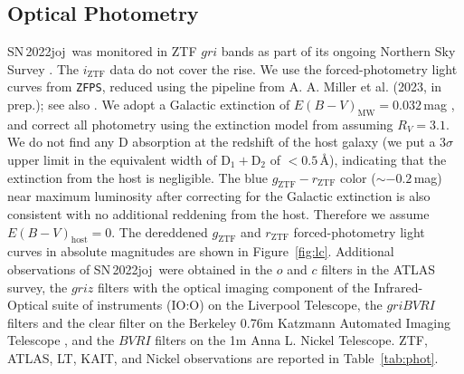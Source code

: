 \documentclass[twocolumn]{aastex631}
\newcommand{\sn}{SN\,2022joj}
\begin{document}
\begin{CJK*}{UTF8}{gbsn}


\subsection{Optical Photometry}
\sn\ was monitored in ZTF $gri$ bands as part of its ongoing Northern Sky Survey \citep{Bellm_ZTF_2019b}. The $i_\mathrm{ZTF}$ data do not cover the rise. We use the forced-photometry light curves from \texttt{ZFPS}, reduced using the pipeline from A. A. Miller et al. (2023, in prep.); see also \citet{Yao_2019}. We adopt a Galactic extinction of ${E(B-V)_\mathrm{MW}}=0.032$\,mag \citep{Schlafly2011}, and correct all photometry using the extinction model from \citet{Fitzpatrick1999} assuming $R_V=3.1$. We do not find any  D absorption at the redshift of the host galaxy (we put a 3$\sigma$ upper limit in the equivalent width of  $\mathrm{D_1}+\mathrm{D_2}$ of $<$$0.5$\,\r{A}), indicating that the extinction from the host is negligible. The blue $g_\mathrm{ZTF}-r_\mathrm{ZTF}$ color ($\sim$$-0.2$\,mag) near maximum luminosity after correcting for the Galactic extinction is also consistent with no additional reddening from the host. Therefore we assume ${E(B-V)}_\mathrm{host}=0$. The dereddened $g_\mathrm{ZTF}$ and $r_\mathrm{ZTF}$ forced-photometry light curves in absolute magnitudes are shown in Figure~\ref{fig:lc}. 
Additional observations of \sn\ were obtained in the $o$ and $c$ filters in the ATLAS survey, the $griz$ filters with the optical imaging component of the Infrared-Optical suite of instruments (IO:O) on the Liverpool Telescope, the $griBVRI$ filters and the clear filter on the Berkeley 0.76m Katzmann Automated Imaging Telescope \citep[KAIT;][]{KAIT_2001}, and the $BVRI$ filters on the 1m Anna L. Nickel Telescope. ZTF, ATLAS, LT, KAIT, and Nickel observations are reported in Table~\ref{tab:phot}.


\end{CJK*}
\end{document}
